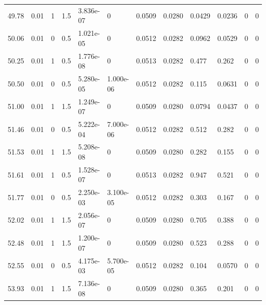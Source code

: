 \documentclass[preview]{standalone}
\begin{document}
{{{{\begin{tabular}{L{1.2cm}C{1.2cm} C{0.3cm}C{0.5cm} C{1.4cm}C{1.4cm} C{1.4cm}C{1.4cm} C{1.6cm}C{1.6cm} C{1.6cm}C{1.6cm}}
  49.78  &  0.01  & 1     & 1.5 &  3.836e-07  & 0  &  0.0509&   0.0280& 0.0429 & 0.0236   &  0 & 0  \\ 
  50.06  &  0.01  & 0     & 0.5 &  1.021e-05  & 0  &  0.0512&   0.0282& 0.0962 & 0.0529   &  0 & 0  \\ 
  50.25  &  0.01  & 1     & 0.5 &  1.776e-08  & 0  &  0.0513&   0.0282& 0.477 & 0.262   &  0 & 0  \\ 
  50.50  &  0.01  & 0     & 0.5 &  5.280e-05  & 1.000e-06  &  0.0512&   0.0282& 0.115 & 0.0631   &  0 & 0  \\ 
  51.00  &  0.01  & 1     & 1.5 &  1.249e-07  & 0  &  0.0509&   0.0280& 0.0794 & 0.0437   &  0 & 0  \\ 
  51.46  &  0.01  & 0     & 0.5 &  5.222e-04  & 7.000e-06  &  0.0512&   0.0282& 0.512 & 0.282   &  0 & 0  \\ 
  51.53  &  0.01  & 1     & 1.5 &  5.208e-08  & 0  &  0.0509&   0.0280& 0.282 & 0.155   &  0 & 0  \\ 
  51.61  &  0.01  & 1     & 0.5 &  1.528e-07  & 0  &  0.0513&   0.0282& 0.947 & 0.521   &  0 & 0  \\ 
  51.77  &  0.01  & 0     & 0.5 &  2.250e-03  & 3.100e-05  &  0.0512&   0.0282& 0.303 & 0.167   &  0 & 0  \\ 
  52.02  &  0.01  & 1     & 1.5 &  2.056e-07  & 0  &  0.0509&   0.0280& 0.705 & 0.388   &  0 & 0  \\ 
  52.48  &  0.01  & 1     & 1.5 &  1.200e-07  & 0  &  0.0509&   0.0280& 0.523 & 0.288   &  0 & 0  \\ 
  52.55  &  0.01  & 0     & 0.5 &  4.175e-03  & 5.700e-05  &  0.0512&   0.0282& 0.104 & 0.0570   &  0 & 0  \\ 
  53.93  &  0.01  & 1     & 1.5 &  7.136e-08  & 0  &  0.0509&   0.0280& 0.365 & 0.201   &  0 & 0  \\ 
\hline 
\end{tabular} 

}}}}
\end{document}
